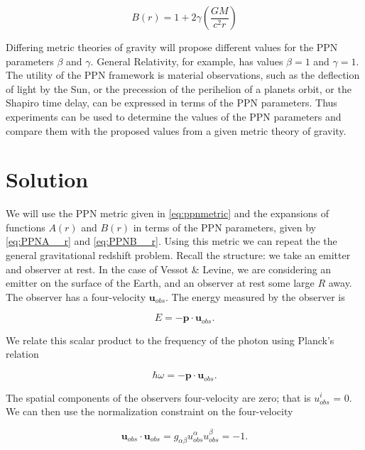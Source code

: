 \documentclass[11pt]{article}
\begin{document}
\begin{equation}
    \label{eq:PPNB__r}
    B(r) = 1 + 2 \gamma \left(\frac{GM}{c^2r}\right)
\end{equation}

Differing metric theories of gravity will propose different values for the PPN parameters $\beta$ and $\gamma$. General Relativity, for example, has values $\beta = 1$ and $\gamma = 1$. The utility of the PPN framework is material observations, such as the deflection of light by the Sun, or the precession of the perihelion of a planets orbit, or the Shapiro time delay, can be expressed in terms of the PPN parameters. Thus experiments can be used to determine the values of the PPN parameters and compare them with the proposed values from a given metric theory of gravity.

\section{Solution}

We will use the PPN metric given in \eqref{eq:ppnmetric} and the expansions of functions $A(r)$ and $B(r)$ in terms of the PPN parameters, given by \eqref{eq:PPNA__r} and \eqref{eq:PPNB__r}. Using this metric we can repeat the the general gravitational redshift problem. Recall the structure: we take an emitter and observer at rest. In the case of Vessot \& Levine, we are considering an emitter on the surface of the Earth, and an observer at rest some large $R$ away. The observer has a four-velocity $\boldsymbol{u}_{obs}$. The energy measured by the observer is

\begin{equation}
    E = - \boldsymbol{p} \cdot \boldsymbol{u}_{obs}.
\end{equation}

We relate this scalar product to the frequency of the photon using Planck's relation

\begin{equation}
    \hbar \omega = - \boldsymbol{p} \cdot \boldsymbol{u}_{obs}.
\end{equation}

The spatial components of the observers four-velocity are zero; that is $u_{obs} ^i$ = 0. We can then use the normalization constraint on the four-velocity

\begin{equation}
    \boldsymbol{u}_{obs} \cdot \boldsymbol{u}_{obs} = g_{\alpha \beta} u_{obs} ^\alpha u_{obs} ^\beta = -1.
\end{equation}
\end{document}
